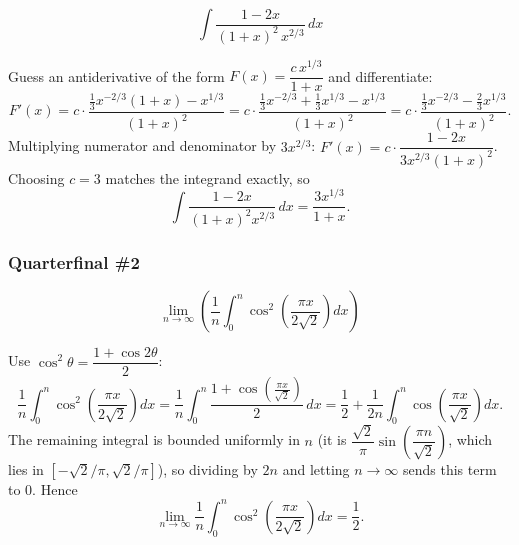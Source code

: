\begin{questions}
\question \[\int \frac{1-2x}{(1+x)^2\,x^{2/3}}\,dx\]
\begin{solution}
Guess an antiderivative of the form $F(x)=\dfrac{c\,x^{1/3}}{1+x}$ and differentiate:
\[F'(x)=c\cdot\frac{\tfrac13x^{-2/3}(1+x)-x^{1/3}}{(1+x)^2}=c\cdot\frac{\tfrac13x^{-2/3}+\tfrac13x^{1/3}-x^{1/3}}{(1+x)^2}=c\cdot\frac{\tfrac13x^{-2/3}-\tfrac23x^{1/3}}{(1+x)^2}.\]
Multiplying numerator and denominator by $3x^{2/3}$: $F'(x)=c\cdot\dfrac{1-2x}{3x^{2/3}(1+x)^2}$. Choosing $c=3$ matches the integrand exactly, so
\[\int \frac{1-2x}{(1+x)^2 x^{2/3}}\,dx=\frac{3x^{1/3}}{1+x}.\]
\end{solution}

\end{questions}

\subsubsection*{Quarterfinal \#2}
\begin{questions}

\question \[\lim_{n\to\infty}\left(\frac1n\int_0^n\cos^2\!\left(\frac{\pi x}{2\sqrt2}\right)dx\right)\]
\begin{solution}
Use $\cos^2\theta=\dfrac{1+\cos2\theta}{2}$:
\[\frac1n\int_0^n\cos^2\!\left(\frac{\pi x}{2\sqrt2}\right)dx=\frac1n\int_0^n\frac{1+\cos\!\left(\frac{\pi x}{\sqrt2}\right)}{2}\,dx=\frac12+\frac{1}{2n}\int_0^n\cos\!\left(\frac{\pi x}{\sqrt2}\right)dx.\]
The remaining integral is bounded uniformly in $n$ (it is $\dfrac{\sqrt2}{\pi}\sin\!\left(\dfrac{\pi n}{\sqrt2}\right)$, which lies in $[-\sqrt2/\pi,\sqrt2/\pi]$), so dividing by $2n$ and letting $n\to\infty$ sends this term to $0$. Hence
\[\lim_{n\to\infty}\frac1n\int_0^n\cos^2\!\left(\frac{\pi x}{2\sqrt2}\right)dx=\frac12.\]
\end{solution}

\end{questions}

